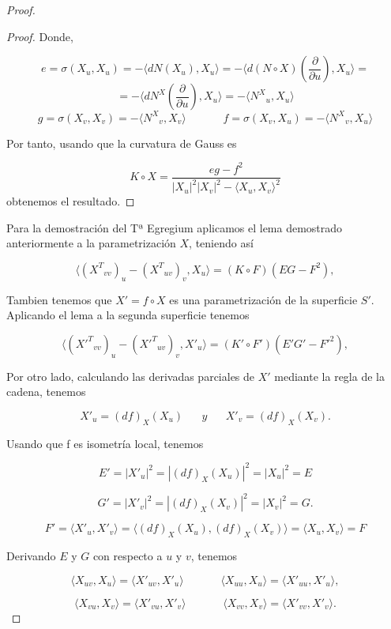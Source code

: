 \begin{proof}
\begin{proof}
		Donde,
		
		\[
			e = \sigma(X_u, X_u) = - \langle dN(X_u), X_u \rangle = - \langle d(N\circ X)(\frac{\partial}{\partial u} ), X_u \rangle =
		\]
		\[
			= - \langle dN^X(\frac{\partial}{\partial u} ), X_u\rangle = - \langle {N^X}_u, X_u \rangle
		\]
	${ }$\\	
		\[
			g = \sigma (X_v, X_v) =  - \langle {N^X}_v, X_v \rangle \;\;\;\;\;\;\;\;\;\;\;\; f = \sigma (X_v, X_u) =  - \langle {N^X}_v, X_u \rangle
		\]
		
		Por tanto, usando que la curvatura de Gauss es
		
		\[
			K \circ X = \frac{eg - f^2}{|X_u|^2|X_v|^2 - \langle X_u, X_v\rangle ^2}
		\]
		obtenemos el resultado.

	\end{proof}
	
	
	Para la demostración del Tª Egregium aplicamos el lema demostrado anteriormente a la parametrización $X$, teniendo así
	
	\[
		\langle ({X^T}_{vv})_u - ({X^T}_{uv})_v, X_u \rangle = (K \circ F)(EG - F^2),
	\]
	
	Tambien tenemos que $X' = f \circ X$ es una parametrización de la superficie $S'$. Aplicando el lema a la segunda superficie tenemos
	
	\[
		\langle ({X'^T}_{vv})_u - ({X'^T}_{uv})_v, X'_u \rangle = (K' \circ F')(E'G' - F'^2),
	\]
	
	Por otro lado, calculando las derivadas parciales de $X'$ mediante la regla de la cadena, tenemos
	
	\[
		X'_u = (df)_X(X_u) \;\;\;\;\;\; y \;\;\;\;\;\; X'_v = (df)_X(X_v).
	\]
	
	Usando que f es isometría local, tenemos
	
	\[
		E' = |X'_u|^2 = |(df)_X(X_u)|^2 = |X_u|^2 = E
	\]
	
	\[
		G' = |X'_v|^2 = |(df)_X(X_v)|^2 = |X_v|^2 = G.
	\]
	
	\[
		F' = \langle X'_u, X'_v \rangle = \langle (df)_X(X_u), (df)_X(X_v) \rangle = \langle X_u, X_v \rangle = F
	\]
	
	Derivando $E$ y $G$ con respecto a $u$ y $v$, tenemos
	
	\[
		\langle X_{uv}, X_u \rangle = \langle X'_{uv}, X'_u \rangle \;\;\;\;\;\;  \;\;\;\;\;\; \langle X_{uu}, X_u \rangle = \langle X'_{uu}, X'_u \rangle,
	\]
	
	\[
		\langle X_{vu}, X_v \rangle = \langle X'_{vu}, X'_v \rangle \;\;\;\;\;\;  \;\;\;\;\;\; \langle X_{vv}, X_v \rangle = \langle X'_{vv}, X'_v \rangle.
	\]
	

\end{proof}
